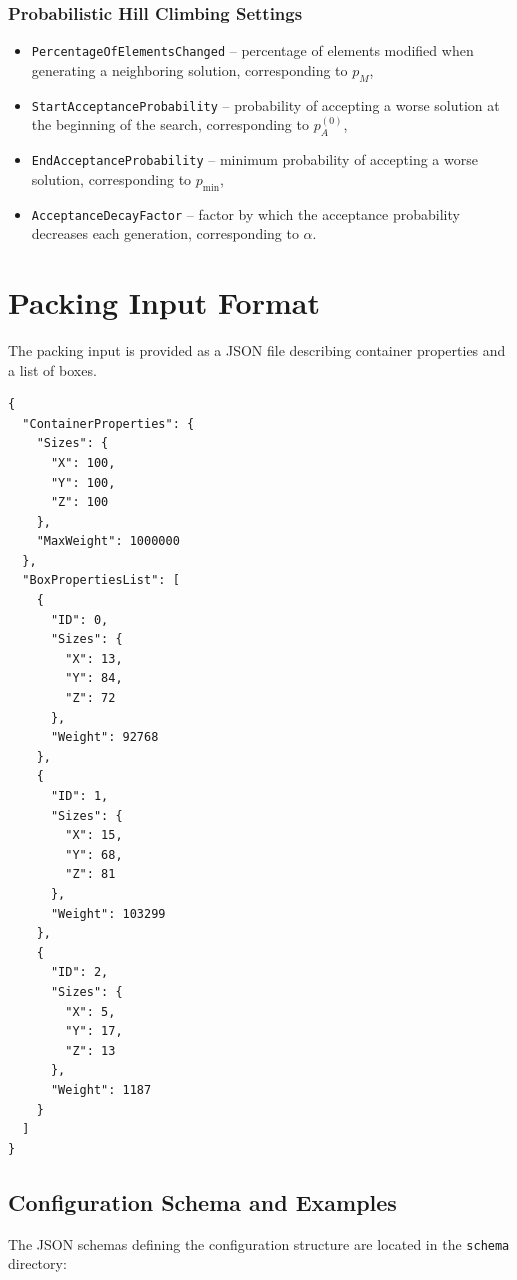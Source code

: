 \subsubsection{Probabilistic Hill Climbing Settings}

\begin{itemize}
    \item \texttt{PercentageOfElementsChanged} -- percentage of elements modified when generating a neighboring solution, corresponding to $p_M$,
    
    \item \texttt{StartAcceptanceProbability} -- probability of accepting a worse solution at the beginning of the search, corresponding to $p_A^{(0)}$,
    
    \item \texttt{EndAcceptanceProbability} -- minimum probability of accepting a worse solution, corresponding to $p_{\min}$,
    
    \item \texttt{AcceptanceDecayFactor} -- factor by which the acceptance probability decreases each generation, corresponding to $\alpha$.
\end{itemize}

\section{Packing Input Format}

The packing input is provided as a JSON file describing container properties and a list of boxes.

\begin{verbatim}
{
  "ContainerProperties": {
    "Sizes": {
      "X": 100,
      "Y": 100,
      "Z": 100
    },
    "MaxWeight": 1000000
  },
  "BoxPropertiesList": [
    {
      "ID": 0,
      "Sizes": {
        "X": 13,
        "Y": 84,
        "Z": 72
      },
      "Weight": 92768
    },
    {
      "ID": 1,
      "Sizes": {
        "X": 15,
        "Y": 68,
        "Z": 81
      },
      "Weight": 103299
    },
    {
      "ID": 2,
      "Sizes": {
        "X": 5,
        "Y": 17,
        "Z": 13
      },
      "Weight": 1187
    }
  ]
}
\end{verbatim}

\subsection{Configuration Schema and Examples}

The JSON schemas defining the configuration structure are located in the \texttt{schema} directory:

